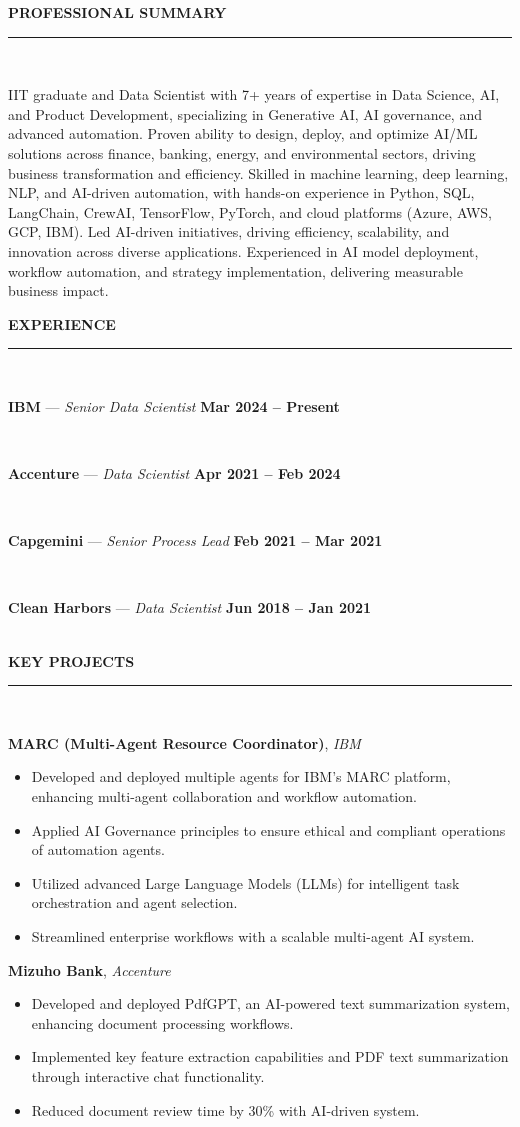 \documentclass[a4paper,9pt]{article}
\newcommand{\cvsection}[2]{%
  \vspace{4pt}
  {\color{primary}\faIcon{#1}\hspace{6pt}\textbf{\fontsize{10pt}{12pt}\selectfont\uppercase{#2}}}\\[-2pt]
  \color{primary}\rule{\linewidth}{0.8pt}\\[-2pt]
  \color{textcolor}
}
\newcommand{\jobentry}[3]{%
  \vspace{2pt}
  \parbox[t]{\linewidth}{\textbf{\textcolor{primary}{#1}} --- \textit{#2} \hfill \textcolor{primary}{\textbf{#3}}}\\[-1pt]
}
\newcommand{\projectentry}[2]{%
  \vspace{2pt}
  \parbox[t]{\linewidth}{\textbf{\textcolor{projectcolor}{#1}}, \textit{\textcolor{primary}{#2}}}
}
\begin{document}
\begin{paracol}{2}
  \setlength{\columnsep}{10pt}
  \setlength{\columnseprule}{0pt}

  \cvsection{user}{Professional Summary}
  \small
  IIT graduate and Data Scientist with 7+ years of expertise in Data Science, AI, and Product Development, specializing in Generative AI, AI governance, and advanced automation. Proven ability to design, deploy, and optimize AI/ML solutions across finance, banking, energy, and environmental sectors, driving business transformation and efficiency. Skilled in machine learning, deep learning, NLP, and AI-driven automation, with hands-on experience in Python, SQL, LangChain, CrewAI, TensorFlow, PyTorch, and cloud platforms (Azure, AWS, GCP, IBM). Led AI-driven initiatives, driving efficiency, scalability, and innovation across diverse applications. Experienced in AI model deployment, workflow automation, and strategy implementation, delivering measurable business impact.

  \cvsection{briefcase}{Experience}
  \small
  \jobentry{IBM}{Senior Data Scientist}{Mar 2024 -- Present}
  \jobentry{Accenture}{Data Scientist}{Apr 2021 -- Feb 2024}
  \jobentry{Capgemini}{Senior Process Lead}{Feb 2021 -- Mar 2021}
  \jobentry{Clean Harbors}{Data Scientist}{Jun 2018 -- Jan 2021}

  \cvsection{project-diagram}{Key Projects}
  \small
  \projectentry{MARC (Multi-Agent Resource Coordinator)}{IBM}
  \begin{itemize}
    \item Developed and deployed multiple agents for IBM’s MARC platform, enhancing multi-agent collaboration and workflow automation.
    \item Applied AI Governance principles to ensure ethical and compliant operations of automation agents.
    \item Utilized advanced Large Language Models (LLMs) for intelligent task orchestration and agent selection.
    \item Streamlined enterprise workflows with a scalable multi-agent AI system.
  \end{itemize}

  \projectentry{Mizuho Bank}{Accenture}
  \begin{itemize}
    \item Developed and deployed PdfGPT, an AI-powered text summarization system, enhancing document processing workflows.
    \item Implemented key feature extraction capabilities and PDF text summarization through interactive chat functionality.
    \item Reduced document review time by 30\% with AI-driven system.
  \end{itemize}


\end{paracol}
\end{document}
